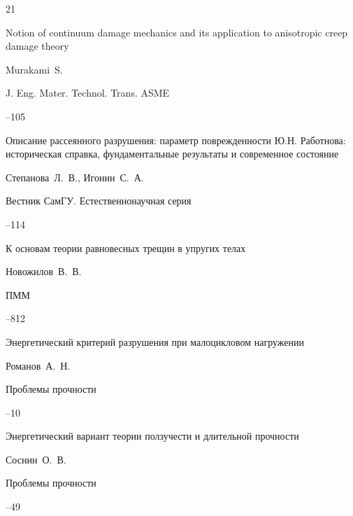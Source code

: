 \begin{thebibliography}{21}

\paper Notion of continuum damage mechanics and its application to anisotropic creep damage theory

\by Murakami~S.

\jour J. Eng. Mater. Technol. Trans. ASME



--105




\paper Описание рассеянного разрушения: параметр поврежденности Ю.Н. Работнова: историческая справка, фундаментальные результаты и современное состояние

\by Степанова~Л.~В., Игонин~С.~А.

\jour Вестник СамГУ. Естественнонаучная серия



--114




\paper К основам теории равновесных трещин в упругих телах

\by Новожилов~В.~В.

\jour ПММ



--812




\paper Энергетический критерий разрушения при малоцикловом нагружении

\by Романов~А.~Н.

\jour Проблемы прочности



--10




\paper Энергетический вариант теории ползучести и длительной прочности

\by Соснин~О.~В.

\jour Проблемы прочности



--49




\end{thebibliography}
